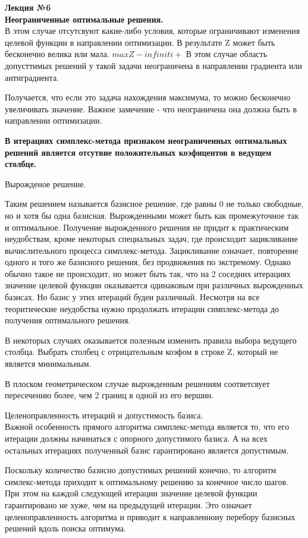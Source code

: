 \LARGE{ \textbf {Лекция №6}}\\
\Large{ \textbf {Неограниченные оптимальные решения.}}\\

В этом случае отсутсвуют какие-либо условия, которые ограничивают изменения целевой функции в направлении оптимизации. 
В результате Z может быть бесконечно велика или мала.
$ max Z - infiniti + $
В этом случае область допусттимых решений у такой задачи неограничена в направлении градиента или антиградиента.

Получается, что если это задача нахождения максимума, то можно бесконечно увеличивать значение.
Важное замечение - что неограничена она должна быть в направлении оптимизации.

\textbf {В итерациях симплекс-метода признаком неограниченных оптимальных решений является отсутвие положительных коэфицентов в ведущем столбце.}

Вырожденое решение.

Таким решением называется базисное решение, где равны 0 не только свободные, но и хотя бы одна базисная.
Вырожденными может быть как промежуточное так и оптимальное.
Получение вырожденного решения не придит к практическим неудобствам, кроме некоторых специальных задач,
где происходит зацикливание вычислительного процесса симплекс-метода.
Зацикливание означает, повторение одного и того же базисного решения, без продвижения по экстремому.
Однако обычно такое не происходит, но может быть так,
что на 2 соседних итерациях значение целевой функции оказывается одинаковым при различных вырожденных базисах.
Но базис у этих итераций будеи различный.
Несмотря на все теоритические неудобства нужно продолжать итерации симплекс-метода до получения оптимального решения.

В некоторых случаях оказывается полезным изменить правила выбора ведущего столбца.
Выбрать столбец с отрицательным коэфом в строке Z, который не является минимальным.

В плоском геометрическом случае вырожденным решениям соответсвует пересечению более, чем 2 границ в одной из его вершин.

Целеноправленность итераций и допустимость базиса.\\
Важной особенность прямого алгоритма симплекс-метода является то, что его итерации должны начинаться с опорного допустимого базиса.
А на всех остальных итерациях полученный базис гарантировано является допустимым.

Поскольку количество базисно допустимых решений конечно, то алгоритм симлекс-метода приходит к оптимальному решению за конечное число шагов.
При этом на каждой следующей итерации значение целевой функции гарантировано не хуже, чем на предыдущей итерации.
Это означает целеноправленность алгоритма и приводит к направленноиу перебору базисных решений вдоль поиска оптимума.


